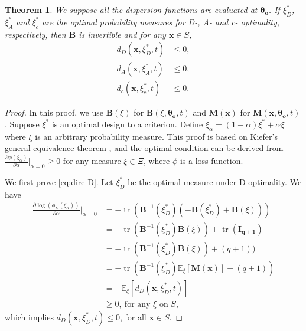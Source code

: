 \documentclass[
]{book}
\newtheorem{theorem}{Theorem}[chapter]
\theoremstyle{definition}
\theoremstyle{definition}
\theoremstyle{definition}
\theoremstyle{definition}
\theoremstyle{remark}
\begin{document}
\begin{theorem}
\protect\hypertarget{thm:dispersion}{}\label{thm:dispersion}We suppose all the dispersion functions are evaluated at \(\boldsymbol{\theta_o}\). If \(\xi_D^*\), \(\xi_A^*\) and \(\xi_c^*\) are the optimal probability measures for D-, A- and c- optimality, respectively, then \(\boldsymbol{B}\) is invertible and for any \(\boldsymbol{x}\in S\),
\begin{align}
d_D(\boldsymbol{x},\xi_D^*,t) &\leq 0, \label{eq:dire-D} \\
d_A(\boldsymbol{x},\xi_A^*,t) &\leq 0, \label{eq:dire-A} \\
d_c(\boldsymbol{x},\xi_c^*,t) &\leq 0. \label{eq:dire-c}
\end{align}
\end{theorem}

\begin{proof}
In this proof, we use \(\boldsymbol{B}(\xi)\) for \(\boldsymbol{B}(\xi,\boldsymbol{\theta_o},t)\) and \(\boldsymbol{M}(\boldsymbol{x})\) for \(\boldsymbol{M}(\boldsymbol{x},\boldsymbol{\theta_o},t)\). Suppose \(\xi^*\) is an optimal design to a criterion. Define \(\xi_\alpha=(1-\alpha)\xi^*+\alpha \xi\) where \(\xi\) is an arbitrary probability measure. This proof is based on Kiefer's general equivalence theorem \citep{kiefer1974general}, and the optimal condition can be derived from \(\frac{\partial \phi(\xi_\alpha)}{\partial \alpha}\big|_{\alpha=0}\geq 0\) for any measure \(\xi \in \Xi\), where \(\phi\) is a loss function.

We first prove \eqref{eq:dire-D}. Let \(\xi_D^*\) be the optimal measure under D-optimality. We have
\begin{align*}
    \frac{\partial \log(\phi_D(\xi_\alpha))}{\partial \alpha}\Big|_{\alpha=0}   
    &=-\operatorname{tr}(\boldsymbol{B}^{-1}(\xi_D^*)(-\boldsymbol{B}(\xi_D^*)+\boldsymbol{B}(\xi)))\\
    &=-\operatorname{tr}(\boldsymbol{B}^{-1}(\xi_D^*)\boldsymbol{B}(\xi))+\operatorname{tr}(\boldsymbol{I_{q+1}})\\
    &=-\operatorname{tr}(\boldsymbol{B}^{-1}(\xi_D^*)\boldsymbol{B}(\xi))+(q+1))\\
    &=-\operatorname{tr}(\boldsymbol{B}^{-1}(\xi_D^*)\mathbb{E}_{\xi}[\boldsymbol{M}(\boldsymbol{x})]-(q+1))\\
    &=-\mathbb{E}_{\xi}[d_D(\boldsymbol{x},\xi_D^*,t)]\\
    &\geq 0,~\text{for any } \xi \text{ on } S,
    \end{align*}
which implies \(d_D(\boldsymbol{x},\xi_D^*,t)\leq 0\), for all \(\boldsymbol{x} \in S\).


\end{proof}
\end{document}
